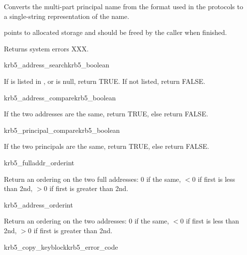 Converts the multi-part principal name  from the
format used in the protocols to a single-string representation of the name.

 points to allocated storage and should be freed by the caller
when finished.

Returns system errors XXX.

\begin{funcdecl}{krb5_address_search}{krb5_boolean}{\funcin}
\end{funcdecl}

If  is listed in , or
 is null, return TRUE.  If not listed, return FALSE.

\begin{funcdecl}{krb5_address_compare}{krb5_boolean}{\funcin}
\end{funcdecl}

If the two addresses are the same, return TRUE, else return FALSE.

\begin{funcdecl}{krb5_principal_compare}{krb5_boolean}{\funcin}
\end{funcdecl}

If the two principals are the same, return TRUE, else return FALSE.

\begin{funcdecl}{krb5_fulladdr_order}{int}{\funcin}
\end{funcdecl}

Return an ordering on the two full addresses:  0 if the same,
$< 0$ if first is less than 2nd, $> 0$ if first is greater than 2nd.

\begin{funcdecl}{krb5_address_order}{int}{\funcin}
\end{funcdecl}

Return an ordering on the two addresses:  0 if the same,
$< 0$ if first is less than 2nd, $> 0$ if first is greater than 2nd.

\begin{funcdecl}{krb5_copy_keyblock}{krb5_error_code}{\funcin}
\funcout
{}
\end{funcdecl}

